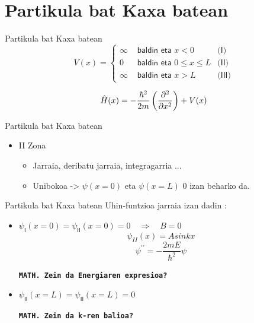 \documentclass[xcolor=x11names,table]{beamer}
\begin{document}
\section{ Partikula bat Kaxa batean }

\begin{frame}{Partikula bat Kaxa batean}
\[
V(x)=\left\{ \begin{array}{lll}
\infty & \textsf{ baldin eta }x<0 & \textsf{(I)}\\
0 & \textsf{ baldin eta }0\leq x\leq L & \textsf{(II)}\\
\infty & \textsf{ baldin eta }x>L & \textsf{(III)}
\end{array}\right.
\]
	
\begin{equation*}
	\Hat{H}(x)=-\dfrac{\hbar^{2}}{2m}\left(\dfrac{\partial^{2}}{\partial x^{2}}\right) + V(x)
\end{equation*}


\end{frame}



\begin{frame}{Partikula bat Kaxa batean}
\begin{itemize}
\item II Zona 
	\begin{itemize}
		\item Jarraia, deribatu jarraia, integragarria ...
		\item Unibokoa -> $\psi(x=0)$ eta $\psi(x=L)$ 0 izan beharko da.
	\end{itemize}
\end{itemize}


\vspace{-0.25 cm}

\end{frame}


\begin{frame}{Partikula bat Kaxa batean}
Uhin-funtzioa jarraia izan dadin :
\begin{itemize}
\item<1->  $ \psi_{\mathsf{I}}(x=0)=\psi_{\mathsf{II}}(x=0)=0\quad\Rightarrow\quad B=0 $
\[
	\psi_{II}(x)=Asin{kx}  
\] 
\[ \psi^{\prime\prime}=-\dfrac{2mE}{\hbar^{2}}\psi \] 

{\tt \bf MATH. Zein da Energiaren expresioa?}
		\item<2-> $ \psi_{\mathsf{II}}(x=L)=\psi_{\mathsf{II}}(x=L)=0 $

{\tt \bf MATH. Zein da k-ren balioa?}

\end{itemize}
\end{frame}
\end{document}
